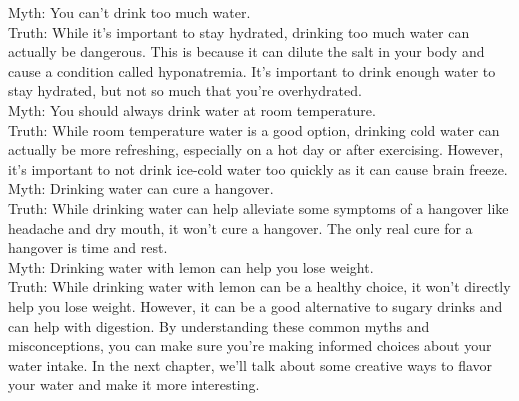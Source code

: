 Myth: You can't drink too much water. \\
Truth: While it's important to stay hydrated, drinking too much water can actually be dangerous. This is because it can dilute the salt in your body and
cause a condition called hyponatremia. It's important to drink enough water to stay hydrated, but not so much that you're overhydrated. \\
Myth: You should always drink water at room temperature. \\
Truth: While room temperature water is a good option, drinking cold water can actually be more refreshing, especially on a hot day or after exercising. However, it's important to not drink ice-cold water too quickly as it can cause brain freeze. \\
Myth: Drinking water can cure a hangover. \\
Truth: While drinking water can help alleviate some symptoms of a hangover like headache and dry mouth, it won't cure a hangover. The only real cure for a hangover is time and rest. \\
Myth: Drinking water with lemon can help you lose weight. \\
Truth: While drinking water with lemon can be a healthy choice, it won't directly help you lose weight. However, it can be a good alternative to sugary drinks and can help with digestion.
By understanding these common myths and misconceptions, you can make sure you're making informed choices about your water intake. In the next chapter, we'll talk about some creative ways to flavor your water and make it more interesting.
